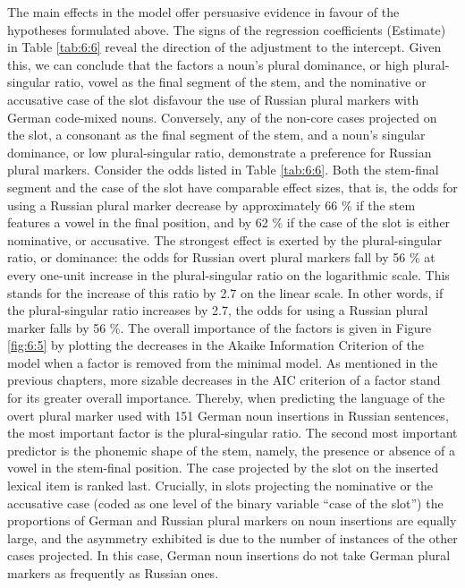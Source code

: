 The main effects in the model offer persuasive evidence in favour of the hypotheses formulated above. The signs of the regression coefficients (Estimate) in Table \ref{tab:6:6} reveal the direction of the adjustment to the intercept. Given this, we can conclude that the factors a noun’s plural dominance, or high plural-singular ratio, vowel as the final segment of the stem, and the nominative or accusative case of the slot disfavour the use of Russian plural markers with German code-mixed nouns. Conversely, any of the non-core cases projected on the slot, a consonant as the final segment of the stem, and a noun's singular dominance, or low plural-singular ratio, demonstrate a preference for Russian plural markers. Consider the odds listed in Table \ref{tab:6:6}. Both the stem-final segment and the case of the slot have comparable effect sizes, that is, the odds for using a Russian plural marker decrease by approximately 66 \% if the stem features a vowel in the final position, and by 62 \% if the case of the slot is either nominative, or accusative. The strongest effect is exerted by the plural-singular ratio, or dominance: the odds for Russian overt plural markers fall by 56 \% at every one-unit increase in the plural-singular ratio on the logarithmic scale. This stands for the increase of this ratio by 2.7 on the linear scale. In other words, if the plural-singular ratio increases by 2.7, the odds for using a Russian plural marker falls by 56 \%. The overall importance of the factors is given in Figure \ref{fig:6:5} by plotting the decreases in the Akaike Information Criterion of the model when a factor is removed from the minimal model. As mentioned in the previous chapters, more sizable decreases in the AIC criterion of a factor stand for its greater overall importance. Thereby, when predicting the language of the overt plural marker used with 151 German noun insertions in Russian sentences, the most important factor is the plural-singular ratio. The second most important predictor is the phonemic shape of the stem, namely, the presence or absence of a vowel in the stem-final position. The case projected by the slot on the inserted lexical item is ranked last. Crucially, in slots projecting the nominative or the accusative case (coded as one level of the binary variable “case of the slot”) the proportions of German and Russian plural markers on noun insertions are equally large, and the asymmetry exhibited is due to the number of instances of the other cases projected. In this case, German noun insertions do not take German plural markers as frequently as Russian ones.

